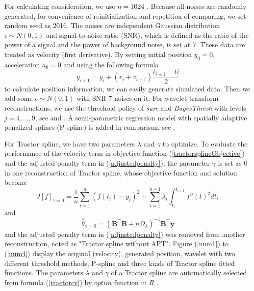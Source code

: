 For calculating consideration, we use $n=1024$ \cite{nason2010wavelet}. Because all noises are randomly generated, for convenience of reinitialization and repetition of comparing, we set random seed as 2016. The noises are independent Gaussian distribution $\epsilon \sim N(0,1)$ and signal-to-noise ratio (SNR), which is defined as the ratio of the power of a signal and the power of background noise, is set at 7. These data are treated as velocity (first derivative). By setting initial position $y_0=0$, acceleration $a_0=0$ and using the following formula 
\begin{equation}\label{generateVelocity}
y_{i+1}=y_i+(v_i+v_{i+1})\frac{t_{i+1}-ti}{2}
\end{equation}
to calculate position information, we can easily generate simulated data. Then we add some \iid $\epsilon \sim N(0,1)$ with SNR 7 noises on it. For wavelet transform reconstructions, we use the threshold policy of \textit{sure} and \textit{BayesThresh} with levels $j=4, \ldots, 9$, see  \cite{donoho1995adapting} and \cite{abramovich1998wavelet}. A semi-parametric regression model with spatially adaptive penalized splines (P-spline) is added in comparison, see \cite{krivobokova2008fast} \cite{ruppert2003semiparametric}.

For Tractor spline, we have two parameters $\lambda$ and $\gamma$ to optimize. To evaluate the performance of the velocity term in objective function (\ref{tractorsplineObjective}) and the adjusted penalty term in (\ref{adjustedpenalty}), the parameter $\gamma$ is set as 0 in one reconstruction of Tractor spline, whose objective function and solution become
\begin{equation}\label{ofgamma0}
J[f]_{\gamma=0}= \frac{1}{n} \sum_{i=1}^{n} (f(t_i)-y_i)^2 +\sum_{i=1}^{n-1} \lambda_i\int_{t_i}^{t_{i+1}} f''(t)^2 dt,
\end{equation}
and
\begin{equation}\label{thetahat0}
\hat{\theta}_{\gamma=0}=(\mathbf{B}^\top\mathbf{B}+n\Omega_{\lambda})^{-1}\mathbf{B}^\top\mathbf{y}
\end{equation}
and the adjusted penalty term in (\ref{adjustedpenalty}) was removed from another reconstruction, noted as "Tractor spline without APT". Figure (\ref{num1}) to (\ref{num4}) display the original (velocity), generated position, wavelet with two different threshold methods, P-spline and three kinds of Tractor spline fitted functions. The parameters $\lambda$ and $\gamma$ of a Tractor spline are automatically selected from formula (\ref{tractorcv}) by $\textit{optim}$ function in $R$ \cite{nelder1965simplex}.


